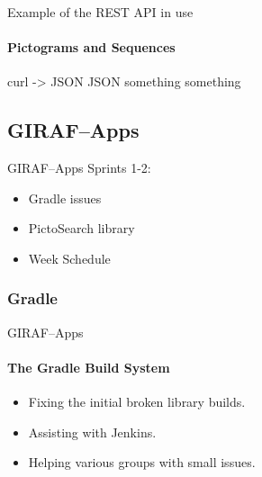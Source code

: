         \begin{frame}[t]{Example of the REST API in use}\framesubtitle{Pictograms and Sequences}
            curl -> JSON
            JSON something something
        \end{frame}

    \subsection{GIRAF--Apps}
        \begin{frame}[t]{GIRAF--Apps}
            Sprints 1-2:
            \begin{itemize}
                \item Gradle issues
                \item PictoSearch library
                \item Week Schedule
            \end{itemize}
        \end{frame}


        \subsubsection{Gradle}
            \begin{frame}[t]{GIRAF--Apps}\framesubtitle{The Gradle Build System}
                \begin{itemize}
                    \item Fixing the initial broken library builds.
                    \item Assisting with Jenkins.
                    \item Helping various groups with small issues.
                \end{itemize}
            \end{frame}

